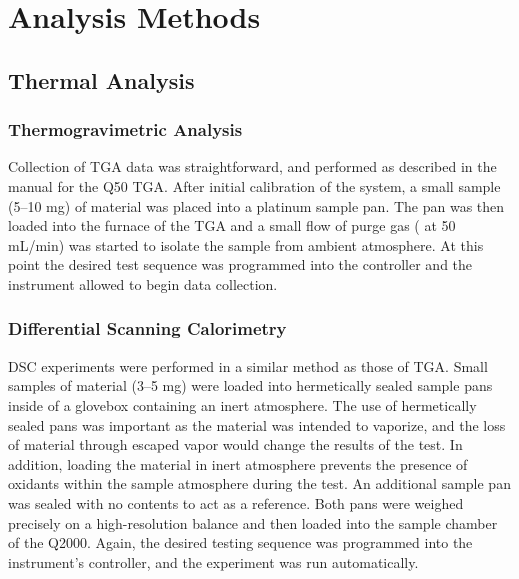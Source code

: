 \chapter{Analysis Methods}
\label{ch:Methods}
\thispagestyle{empty}



\section{Thermal Analysis}
\label{sec:Methods-Thermal}


\subsection{Thermogravimetric Analysis}

Collection of TGA data was straightforward, and performed as described in the manual for the Q50 TGA. After initial calibration of the system, a small sample (5--10 mg) of material was placed into a platinum sample pan. The pan was then loaded into the furnace of the TGA and a small flow of purge gas ( at 50 mL/min) was started to isolate the sample from ambient atmosphere. At this point the desired test sequence was programmed into the controller and the instrument allowed to begin data collection. 


\subsection{Differential Scanning Calorimetry}

DSC experiments were performed in a similar method as those of TGA. Small samples of material (3--5 mg) were loaded into hermetically sealed sample pans inside of a glovebox containing an inert atmosphere. The use of hermetically sealed pans was important as the material was intended to vaporize, and the loss of material through escaped vapor would change the results of the test. In addition, loading the material in inert atmosphere prevents the presence of oxidants within the sample atmosphere during the test. An additional sample pan was sealed with no contents to act as a reference. Both pans were weighed precisely on a high-resolution balance and then loaded into the sample chamber of the Q2000. Again, the desired testing sequence was programmed into the instrument's controller, and the experiment was run automatically. 

